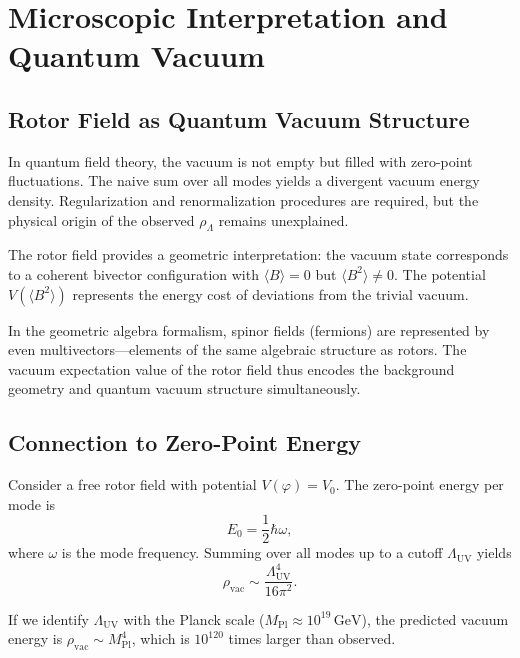 \documentclass[11pt,a4paper]{article}
\numberwithin{equation}{section}
\theoremstyle{plain}
\theoremstyle{definition}
\theoremstyle{remark}
\begin{document}
\section{Microscopic Interpretation and Quantum Vacuum}
\label{sec:micro}

\subsection{Rotor Field as Quantum Vacuum Structure}

In quantum field theory, the vacuum is not empty but filled with zero-point fluctuations. The naive sum over all modes yields a divergent vacuum energy density. Regularization and renormalization procedures are required, but the physical origin of the observed $\rho_\Lambda$ remains unexplained.

The rotor field provides a geometric interpretation: the vacuum state corresponds to a coherent bivector configuration with $\langle B \rangle = 0$ but $\langle B^2 \rangle \neq 0$. The potential $V(\langle B^2 \rangle)$ represents the energy cost of deviations from the trivial vacuum.

In the geometric algebra formalism, spinor fields (fermions) are represented by even multivectors---elements of the same algebraic structure as rotors. The vacuum expectation value of the rotor field thus encodes the background geometry and quantum vacuum structure simultaneously.

\subsection{Connection to Zero-Point Energy}

Consider a free rotor field with potential $V(\varphi) = V_0$. The zero-point energy per mode is
\begin{equation}
E_0 = \frac{1}{2}\hbar\omega,
\end{equation}
where $\omega$ is the mode frequency. Summing over all modes up to a cutoff $\Lambda_{\mathrm{UV}}$ yields
\begin{equation}
\rho_{\mathrm{vac}} \sim \frac{\Lambda_{\mathrm{UV}}^4}{16\pi^2}.
\end{equation}

If we identify $\Lambda_{\mathrm{UV}}$ with the Planck scale ($M_{\mathrm{Pl}} \approx 10^{19}\,\mathrm{GeV}$), the predicted vacuum energy is $\rho_{\mathrm{vac}} \sim M_{\mathrm{Pl}}^4$, which is $10^{120}$ times larger than observed.
\end{document}
